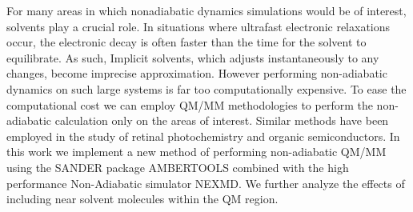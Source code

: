 For many areas in which nonadiabatic dynamics simulations would be of interest, solvents play a crucial role.
In situations where ultrafast electronic relaxations occur, the electronic decay is often faster than the time for the solvent to equilibrate.
As such, Implicit solvents, which adjusts instantaneously to any changes, become imprecise approximation.
However performing non-adiabatic dynamics on such large systems is far too computationally expensive.
To ease the computational cost we can employ QM/MM methodologies to perform the non-adiabatic calculation only on the areas of interest.
Similar methods have been employed in the study of retinal photochemistry and organic semiconductors.\cite{weingart2012modelling,demoulin2017fine,heck2015multi}%
In this work we implement a new method of performing non-adiabatic QM/MM using the SANDER package AMBERTOOLS combined with the high performance Non-Adiabatic simulator NEXMD.
We further analyze the effects of including near solvent molecules within the QM region.
